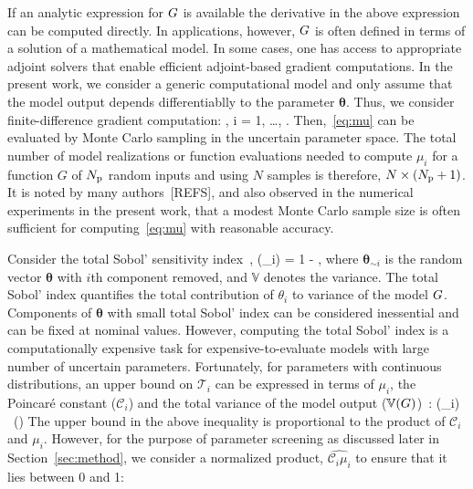 If an analytic expression for $G$ is available the derivative in the above
expression can be computed directly. In applications, however, $G$ is often
defined in terms of a solution of a mathematical model. In some cases, 
one has access to appropriate adjoint solvers that enable efficient
adjoint-based gradient computations. In the present work, we consider
a generic computational model and only assume that the model
output depends differentiablly to the parameter $\bm{\theta}$. Thus, 
we consider finite-difference gradient computation: 
\be
{} 
\approx
{}, \quad i = 1, \ldots, \Np. 
\label{eq:partial}
\ee
Then,~\eqref{eq:mu} can be evaluated by Monte Carlo sampling in
the uncertain parameter space. 
The total number of model realizations or function evaluations
needed to
compute $\mu_i$ for a function $G$ of ${N_\text{p}}$ random inputs and using $N$ samples is
therefore, $N\times({N_\text{p}}+1)$. 
It is noted by many authors~[REFS], and also observed
in the numerical experiments in the present work, that a modest Monte Carlo
sample size is often sufficient for computing~\eqref{eq:mu} with reasonable
accuracy.

Consider the total 
Sobol' sensitivity index~\cite{Sobol:2001},
\be
{}(\theta_i) = 1 - 
,
\label{eq:total}
\ee
where $\bm{\theta}_{\sim i}$ is the random vector $\bm\theta$ with $i$th component removed, 
and $\mathbb{V}$ denotes the variance. The total Sobol' index quantifies the total contribution 
of $\theta_i$ to variance of the model $G$. Components of $\bm\theta$ with small 
total Sobol' index can be considered inessential and can be fixed at nominal values. However, 
computing the total Sobol' index is a computationally expensive task for expensive-to-evaluate 
models with large number of uncertain parameters. Fortunately, 
for parameters with continuous distributions, an upper bound on $\mathcal{T}_i$  
can be expressed in terms of $\mu_i$, the Poincar\'e constant ($\mathcal{C}_i$) and the total 
variance of the model output ($\mathbb{V}(G)$)~\cite{Lamboni:2013}:
\be
{}(\theta_i) \leq {}~(\propto {})
\label{eq:bound}
\ee
The upper bound in the above inequality is proportional to the product of
$\mathcal{C}_i$ and $\mu_i$. However, for the purpose of parameter screening as
discussed later in Section~\ref{sec:method}, we consider a normalized product,
$\widehat{\mathcal{C}_i\mu_i}$ to ensure that it lies between 0 and 1:

